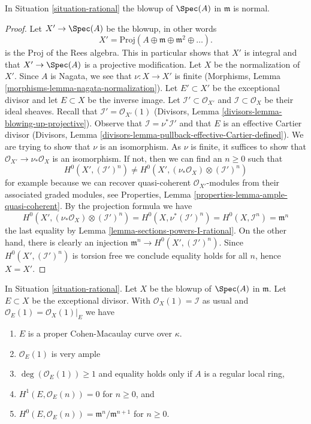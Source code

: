 \begin{lemma}
\label{lemma-blow-up-normal-rational}
In Situation \ref{situation-rational}
the blowup of $\Spec(A)$ in $\mathfrak m$ is normal.
\end{lemma}

\begin{proof}
Let $X' \to \Spec(A)$ be the blowup, in other words
$$
X' = \text{Proj}(A \oplus \mathfrak m \oplus \mathfrak m^2 \oplus \ldots).
$$
is the Proj of the Rees algebra. This in particular shows that
$X'$ is integral and that $X' \to \Spec(A)$ is a projective
modification. Let $X$ be the normalization of $X'$.
Since $A$ is Nagata, we see that $\nu : X \to X'$ is finite
(Morphisms, Lemma \ref{morphisms-lemma-nagata-normalization}).
Let $E' \subset X'$ be the exceptional divisor and let $E \subset X$
be the inverse image. Let $\mathcal{I}' \subset \mathcal{O}_{X'}$
and $\mathcal{I} \subset \mathcal{O}_X$ be their ideal sheaves.
Recall that $\mathcal{I}' = \mathcal{O}_{X'}(1)$
(Divisors, Lemma \ref{divisors-lemma-blowing-up-projective}).
Observe that $\mathcal{I} = \nu^*\mathcal{I}'$ and that $E$ is an
effective Cartier divisor (Divisors, Lemma
\ref{divisors-lemma-pullback-effective-Cartier-defined}).
We are trying to show that $\nu$ is an isomorphism. As $\nu$ is finite,
it suffices to show that $\mathcal{O}_{X'} \to \nu_*\mathcal{O}_X$
is an isomorphism. If not, then we can find an $n \geq 0$ such that
$$
H^0(X', (\mathcal{I}')^n) \not =
H^0(X', (\nu_*\mathcal{O}_X) \otimes (\mathcal{I}')^n)
$$
for example because we can recover quasi-coherent $\mathcal{O}_{X'}$-modules
from their associated graded modules, see
Properties, Lemma \ref{properties-lemma-ample-quasi-coherent}.
By the projection formula we have
$$
H^0(X', (\nu_*\mathcal{O}_X) \otimes (\mathcal{I}')^n) =
H^0(X, \nu^*(\mathcal{I}')^n) =
H^0(X, \mathcal{I}^n) = \mathfrak m^n
$$
the last equality by Lemma \ref{lemma-sections-powers-I-rational}.
On the other hand, there is clearly an injection
$\mathfrak m^n \to H^0(X', (\mathcal{I}')^n)$. Since
$H^0(X', (\mathcal{I}')^n)$ is torsion free we conclude equality holds
for all $n$, hence $X = X'$.
\end{proof}

\begin{lemma}
\label{lemma-cohomology-blow-up-rational}
In Situation \ref{situation-rational}.
Let $X$ be the blowup of $\Spec(A)$ in $\mathfrak m$. Let $E \subset X$
be the exceptional divisor. With $\mathcal{O}_X(1) = \mathcal{I}$ as
usual and $\mathcal{O}_E(1) = \mathcal{O}_X(1)|_E$ we have
\begin{enumerate}
\item $E$ is a proper Cohen-Macaulay curve over $\kappa$.
\item $\mathcal{O}_E(1)$ is very ample
\item $\deg(\mathcal{O}_E(1)) \geq 1$ and equality holds only if
$A$ is a regular local ring,
\item $H^1(E, \mathcal{O}_E(n)) = 0$ for $n \geq 0$, and
\item $H^0(E, \mathcal{O}_E(n)) = \mathfrak m^n/\mathfrak m^{n + 1}$
for $n \geq 0$.
\end{enumerate}
\end{lemma}

